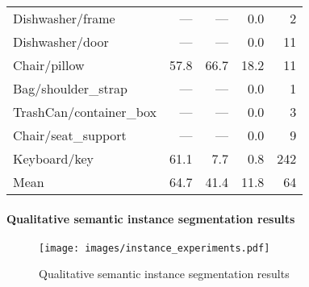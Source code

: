 \begin{table}[!htb]
\begin{tabular}{lrrrr}
Dishwasher/frame               &  --- &        --- &     0.0 &              2 \\
Dishwasher/door                &  --- &        --- &     0.0 &             11 \\
Chair/pillow                   & 57.8 &       66.7 &    18.2 &             11 \\
Bag/shoulder\_strap             &  --- &        --- &     0.0 &              1 \\
TrashCan/container\_box         &  --- &        --- &     0.0 &              3 \\
Chair/seat\_support             &  --- &        --- &     0.0 &              9 \\
Keyboard/key                   & 61.1 &        7.7 &     0.8 &            242 \\
\midrule
Mean                           & 64.7 &       41.4 &    11.8 &             64 \\
\bottomrule
\end{tabular}
\end{table}




\paragraph{Qualitative semantic instance segmentation results}
\label{supsec:results:instance-segmentation-qualitative}


\begin{figure}[!t]
\label{fig:instance_experiments}
\centering
\texttt{[image: images/instance\_experiments.pdf]}
\caption{Qualitative semantic instance segmentation results}
\end{figure}


